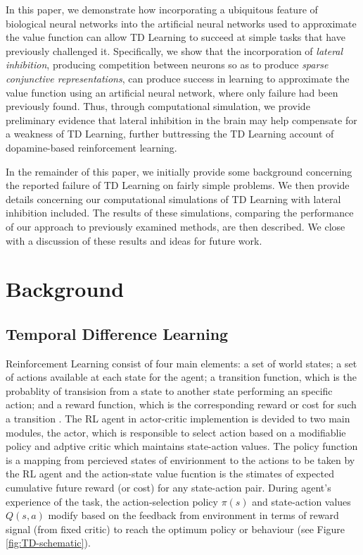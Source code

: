 \documentclass[preprint,12pt,authoryear]{elsarticle}
\begin{document}
In this paper, we demonstrate how incorporating a ubiquitous feature
of biological neural networks into the artificial neural networks used
to approximate the value function can allow TD Learning to succeed at
simple tasks that have previously challenged it. Specifically, we show
that the incorporation of \emph{lateral inhibition}, producing
competition between neurons so as to produce \emph{sparse conjunctive
representations}, can produce success in learning to approximate the
value function using an artificial neural network, where only failure
had been previously found. Thus, through computational simulation, we
provide preliminary evidence that lateral inhibition in the brain may
help compensate for a weakness of TD Learning, further buttressing the
TD Learning account of dopamine-based reinforcement learning.

In the remainder of this paper, we initially provide some background
concerning the reported failure of TD Learning on fairly simple
problems. We then provide details concerning our computational
simulations of TD Learning with lateral inhibition included. The
results of these simulations, comparing the performance of our
approach to previously examined methods, are then described. We close
with a discussion of these results and ideas for future work.



\section{Background} %
\label{sec:background}
\subsection{Temporal Difference Learning} %
\label{sub:temporal_difference_learning}
Reinforcement Learning consist of four main elements: a set of world states; a set of actions available at each state for the agent; a transition function, which is the probablity of transision from a state to another state performing an specific action; and a reward function, which is the corresponding reward or cost for such a transition \citep{SuttonRS:1998:Book,Botvinick-Niv-Barto:2009:HRL}. The RL agent in actor-critic implemention is devided to two main modules, the actor, which is responsible to select action based on a modifiablie policy and adptive critic which maintains state-action values. The policy function is a mapping from percieved states of envirionment to the actions to be taken by the RL agent and the action-state value fucntion is the stimates of expected cumulative future reward (or cost) for any state-action pair. During agent's experience of the task, the action-selection policy $\pi(s)$  and state-action values $Q(s,a)$ modify based on the feedback from environment in terms of reward signal (from fixed critic) to reach the optimum policy or behaviour (see Figure \ref{fig:TD-schematic}).   
\end{document}
